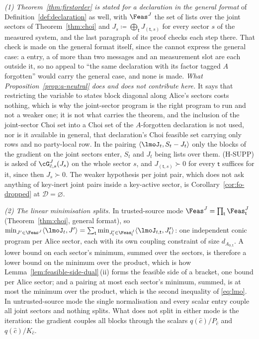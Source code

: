 \begin{remark}\label{rem:fo-general-format}
\emph{(1) Theorem~\ref{thm:firstorder} is stated for a declaration in the
general format} of Definition~\ref{def:declaration} as well, with
$\Feas^{J}$ the set of lists over the joint sectors of
Theorem~\ref{thm:choi} and $J_s\coloneqq\bigoplus_{\mathsf t}
J_{(\mathsf t,s)}$ for every sector $s$ of the measured system, and the
last paragraph of its proof checks each step there. That check is made on
the general format itself, since the  cannot express
the general case: a  entry, a
 of more than two messages and an
 measurement slot are each outside it, so no appeal to
``the same declaration with its factor tagged $A$ forgotten'' would carry
the general case, and none is made.
\emph{What Proposition~\ref{prop:a-neutral} does and does not contribute
here.} It says that restricting the variable to states block diagonal along
Alice's sectors costs nothing, which is why the joint-sector program is the
right program to run and not a weaker one; it is not what carries the
theorem, and the inclusion of the joint-sector Choi set into a Choi set of
the $A$-forgotten declaration is not used, nor is it available in general,
that declaration's Choi feasible set carrying only
 rows and no party-local row. In the
pairing $\langle\lmoJ_t,S_t-J_t\rangle$ only the blocks of the gradient on
the joint sectors enter, $S_t$ and $J_t$ being lists over them. (H-SUPP) is
asked of $\cG^{J}_{\hat c,s}(J_s)$ on the whole sector $s$, and
$J_{(\mathsf t,s)}\succ0$ for every $\mathsf t$ suffices for it, since then
$J_s\succ0$. The weaker hypothesis per joint pair, which does not ask
anything of key-inert joint pairs inside a key-active sector, is
Corollary~\ref{cor:fo-dropped} at $\mathcal{D}=\varnothing$.

\emph{(2) The linear minimisation splits.} In trusted-source mode
$\Feas^{J}=\prod_{\mathsf t}\Feas^{J}_{\mathsf t}$
(Theorem~\ref{thm:choi}, general format), so
$\min_{J'\in\Feas^{J}}\langle\lmoJ_t,J'\rangle
=\sum_{\mathsf t}\min_{J'_{\mathsf t}\in\Feas^{J}_{\mathsf t}}
\langle\lmoJ_{t,\mathsf t},J'_{\mathsf t}\rangle$: one independent conic
program per Alice sector, each with its own coupling constraint of size
$d_{A_{0,\mathsf t}}$. A lower bound on each sector's minimum, summed over
the sectors, is therefore a lower bound on the minimum over the product,
which is how Lemma~\ref{lem:feasible-side-dual}\,(ii) forms the feasible
side of a bracket, one bound per Alice sector; and a pairing at most each
sector's minimum, summed, is at most the minimum over the product, which is
the second inequality of \eqref{eq:lmo}.
In untrusted-source mode the single normalisation and every scalar entry
couple all joint sectors and nothing splits. What does not split in either
mode is the iteration: the gradient couples all blocks through the scalars
$q(\hat c)/P_{\hat c}$ and $q(\hat c)/K_{\hat c}$.


\end{remark}
